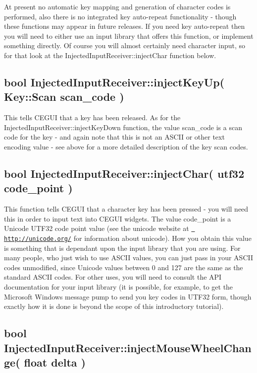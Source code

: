 At present no automatic key mapping and generation of character codes is performed, also there is no integrated key auto-\/repeat functionality -\/ though these functions may appear in future releases. If you need key auto-\/repeat then you will need to either use an input library that offers this function, or implement something directly. Of course you will almost certainly need character input, so for that look at the Injected\+Input\+Receiver\+::inject\+Char function below.\hypertarget{input_tutorial_input_tutorial_keyup}{}\subsection{bool Injected\+Input\+Receiver\+::inject\+Key\+Up( Key\+::\+Scan scan\+\_\+code )}\label{input_tutorial_input_tutorial_keyup}
This tells C\+E\+G\+UI that a key has been released. As for the Injected\+Input\+Receiver\+::inject\+Key\+Down function, the value {\ttfamily scan\+\_\+code} is a scan code for the key -\/ and again note that this is not an A\+S\+C\+II or other text encoding value -\/ see above for a more detailed description of the key scan codes.\hypertarget{input_tutorial_input_tutorial_char}{}\subsection{bool Injected\+Input\+Receiver\+::inject\+Char( utf32 code\+\_\+point )}\label{input_tutorial_input_tutorial_char}
This function tells C\+E\+G\+UI that a character key has been pressed -\/ you will need this in order to input text into C\+E\+G\+UI widgets. The value {\ttfamily code\+\_\+point\textquotesingle{}} is a Unicode U\+T\+F32 code point value (see the unicode website at \href{http://unicode.org/}{\texttt{ http\+://unicode.\+org/}} for information about unicode). How you obtain this value is something that is dependant upon the input library that you are using. For many people, who just wish to use A\+S\+C\+II values, you can just pass in your A\+S\+C\+II codes unmodified, since Unicode values between 0 and 127 are the same as the standard A\+S\+C\+II codes. For other uses, you will need to consult the A\+PI documentation for your input library (it is possible, for example, to get the Microsoft Windows message pump to send you key codes in U\+T\+F32 form, though exactly how it is done is beyond the scope of this introductory tutorial).\hypertarget{input_tutorial_input_tutorial_mwheel}{}\subsection{bool Injected\+Input\+Receiver\+::inject\+Mouse\+Wheel\+Change( float delta )}\label{input_tutorial_input_tutorial_mwheel}
